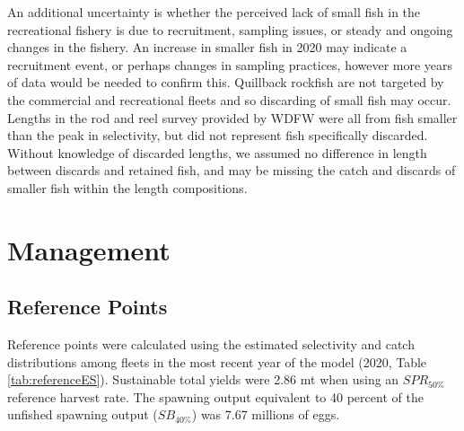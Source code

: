 \documentclass[11pt,
  english,
  a4paper,
]{article}
\begin{document}
\leavevmode\tagmcend\tagstructend\par


An additional uncertainty is whether the perceived lack of small fish in the recreational fishery is due to recruitment, sampling issues, or steady and ongoing changes in the fishery. An increase in smaller fish in 2020 may indicate a recruitment event, or perhaps changes in sampling practices, however more years of data would be needed to confirm this. Quillback rockfish are not targeted by the commercial and recreational fleets and so discarding of small fish may occur. Lengths in the rod and reel survey provided by WDFW were all from fish smaller than the peak in selectivity, but did not represent fish specifically discarded. Without knowledge of discarded lengths, we assumed no difference in length between discards and retained fish, and may be missing the catch and discards of smaller fish within the length compositions.

\leavevmode\tagmcend\tagstructend\par


\hypertarget{management}{%
\section{Management}\label{management}}

\leavevmode\tagmcend\tagstructend


\hypertarget{reference-points}{%
\subsection{Reference Points}\label{reference-points}}

\leavevmode\tagmcend\tagstructend


Reference points were calculated using the estimated selectivity and catch distributions among fleets in the most recent year of the model (2020, Table \ref{tab:referenceES}). Sustainable total yields were 2.86 mt when using an {\(SPR_{50\%}\)\leavevmode\tagmcend\tagstructend} reference harvest rate. The spawning output equivalent to 40 percent of the unfished spawning output ({\(SB_{40\%}\)\leavevmode\tagmcend\tagstructend}) was 7.67 millions of eggs.
\end{document}
